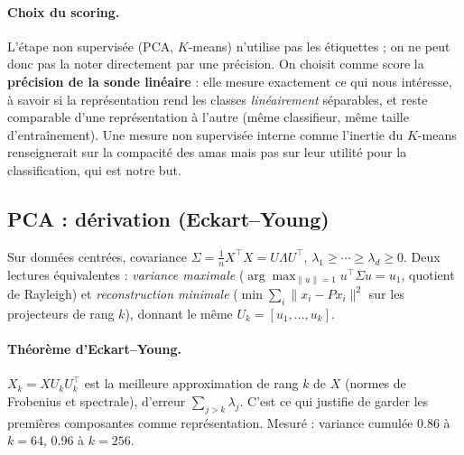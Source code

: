 \documentclass[11pt,a4paper]{article}
\newcommand{\norm}[1]{\lVert #1 \rVert}
\newcommand{\T}{^{\top}}
\begin{document}
\paragraph{Choix du scoring.} L'étape non supervisée (PCA, $K$-means) n'utilise pas
les étiquettes ; on ne peut donc pas la noter directement par une précision. On
choisit comme score la \textbf{précision de la sonde linéaire} : elle mesure
exactement ce qui nous intéresse, à savoir si la représentation rend les classes
\emph{linéairement} séparables, et reste comparable d'une représentation à l'autre
(même classifieur, même taille d'entraînement). Une mesure non supervisée interne
comme l'inertie du $K$-means renseignerait sur la compacité des amas mais pas sur
leur utilité pour la classification, qui est notre but.

\subsection{PCA : dérivation (Eckart–Young)}\label{sec:pca}
Sur données centrées, covariance $\Sigma=\tfrac1n X\T X=U\Lambda U\T$,
$\lambda_1\ge\cdots\ge\lambda_d\ge0$. Deux lectures équivalentes :
\emph{variance maximale} ($\arg\max_{\norm u=1} u\T\Sigma u = u_1$, quotient de
Rayleigh) et \emph{reconstruction minimale}
($\min \sum_i\norm{x_i-Px_i}^2$ sur les projecteurs de rang $k$), donnant le même
$U_k=[u_1,\dots,u_k]$.
\paragraph{Théorème d'Eckart–Young.} $X_k=XU_kU_k\T$ est la meilleure
approximation de rang $k$ de $X$ (normes de Frobenius et spectrale), d'erreur
$\sum_{j>k}\lambda_j$. C'est ce qui justifie de garder les premières composantes
comme représentation. Mesuré : variance cumulée $0.86$ à $k{=}64$, $0.96$ à
$k{=}256$.
\end{document}
